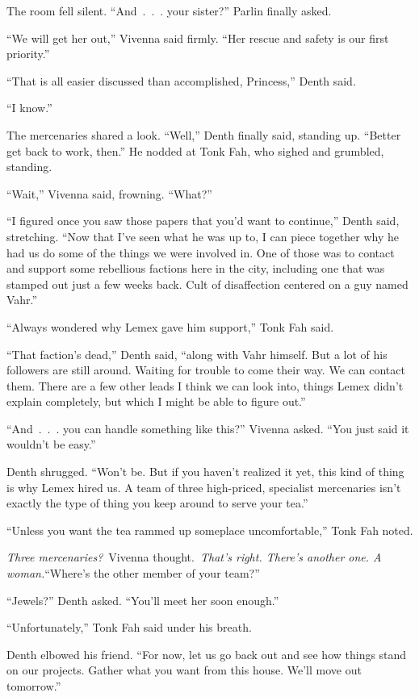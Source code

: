 The room fell silent. “And~.~.~. your sister?” Parlin finally asked.

“We will get her out,” Vivenna said firmly. “Her rescue and safety is our first priority.”

“That is all easier discussed than accomplished, Princess,” Denth said.

“I know.”

The mercenaries shared a look. “Well,” Denth finally said, standing up. “Better get back to work, then.” He nodded at Tonk Fah, who sighed and grumbled, standing.

“Wait,” Vivenna said, frowning. “What?”

“I figured once you saw those papers that you’d want to continue,” Denth said, stretching. “Now that I’ve seen what he was up to, I can piece together why he had us do some of the things we were involved in. One of those was to contact and support some rebellious factions here in the city, including one that was stamped out just a few weeks back. Cult of disaffection centered on a guy named Vahr.”

“Always wondered why Lemex gave him support,” Tonk Fah said.

“That faction’s dead,” Denth said, “along with Vahr himself. But a lot of his followers are still around. Waiting for trouble to come their way. We can contact them. There are a few other leads I think we can look into, things Lemex didn’t explain completely, but which I might be able to figure out.”

“And~.~.~. you can handle something like this?” Vivenna asked. “You just said it wouldn’t be easy.”

Denth shrugged. “Won’t be. But if you haven’t realized it yet, this kind of thing is why Lemex hired us. A team of three high-priced, specialist mercenaries isn’t exactly the type of thing you keep around to serve your tea.”

“Unless you want the tea rammed up someplace uncomfortable,” Tonk Fah noted.

\textit{Three mercenaries?}~Vivenna thought.~\textit{That’s right. There’s another one. A woman.}“Where’s the other member of your team?”

“Jewels?” Denth asked. “You’ll meet her soon enough.”

“Unfortunately,” Tonk Fah said under his breath.

Denth elbowed his friend. “For now, let us go back out and see how things stand on our projects. Gather what you want from this house. We’ll move out tomorrow.”

